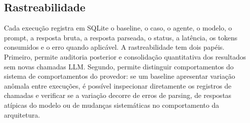 \subsection{Rastreabilidade}

Cada execução registra em SQLite o baseline, o caso, o agente, o modelo,
o prompt, a resposta bruta, a resposta parseada, o status, a latência,
os tokens consumidos e o erro quando aplicável. A rastreabilidade tem
dois papéis. Primeiro, permite auditoria posterior e consolidação
quantitativa dos resultados sem novas chamadas LLM. Segundo, permite
distinguir comportamentos do sistema de comportamentos do provedor: se
um baseline apresentar variação anômala entre execuções, é possível
inspecionar diretamente os registros de chamadas e verificar se a
variação decorre de erros de parsing, de respostas atípicas do modelo
ou de mudanças sistemáticas no comportamento da arquitetura.
